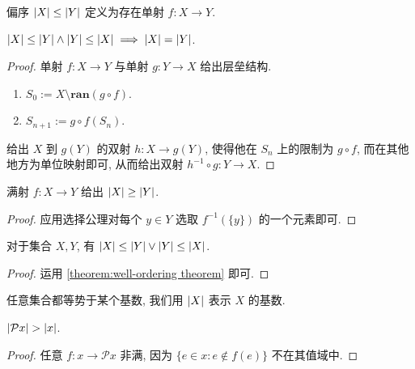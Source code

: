 \begin{definition}
    偏序 \(\abs{X} \le \abs{Y}\) 定义为存在单射 \(f : X \to Y\).
\end{definition}

\begin{lemma}
    \(\abs{X} \le \abs{Y} \land \abs{Y} \le \abs{X} \implies \abs{X} = \abs{Y}\).

    \begin{proof}
        单射 \(f : X \to Y\) 与单射 \(g : Y \to X\) 给出层垒结构.

        \begin{enumerate}
            \item \(S_0 := X \setminus \mathbf{ran} (g \circ f)\).
            \item \(S_{n + 1} := g \circ f (S_n)\).
        \end{enumerate}

        给出 \(X\) 到 \(g(Y)\) 的双射 \(h : X \to g(Y)\),
        使得他在 \(S_n\) 上的限制为 \(g \circ f\), 而在其他地方为单位映射即可, 从而给出双射 \(h^{-1} \circ g : Y \to X\).
    \end{proof}
\end{lemma}

\begin{lemma}
    满射 \(f : X \to Y\) 给出 \(\abs{X} \ge \abs{Y}\).

    \begin{proof}
        应用选择公理对每个 \(y \in Y\) 选取 \(f^{-1} (\{y\})\) 的一个元素即可.
    \end{proof}
\end{lemma}

\begin{lemma}
    对于集合 \(X, Y\), 有 \(\abs{X} \le \abs{Y} \lor \abs{Y} \le \abs{X}\).

    \begin{proof}
        运用 \ref{theorem:well-ordering theorem} 即可.
    \end{proof}
\end{lemma}

\begin{corollary}
    任意集合都等势于某个基数, 我们用 \(\abs{X}\) 表示 \(X\) 的基数.
\end{corollary}

\begin{theorem}
    [Cantor] \label{theorem:Cantor's Px > x} \(\abs{\mathcal{P} x} > \abs{x}\).

    \begin{proof}
        任意 \(f : x \to \mathcal{P} x\) 非满, 因为 \(\{e \in x : e \notin f(e)\}\) 不在其值域中.
    \end{proof}
\end{theorem}

